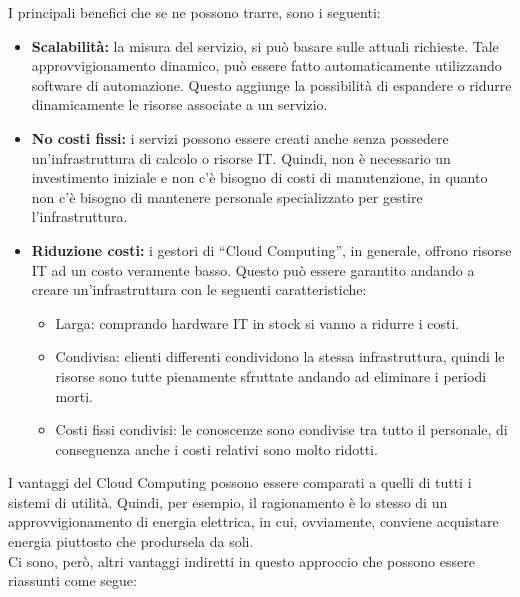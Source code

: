 \documentclass{article}
\begin{document}
I principali benefici che se ne possono trarre, sono i seguenti:
\begin{itemize}
    \item \textbf{Scalabilità:} la misura del servizio, si può basare sulle attuali richieste. Tale approvvigionamento dinamico, può essere fatto automaticamente utilizzando software di automazione. Questo aggiunge la possibilità di espandere o ridurre dinamicamente le risorse associate a un servizio.
    \item \textbf{No costi fissi:} i servizi possono essere creati anche senza possedere un’infrastruttura di calcolo o risorse IT. Quindi, non è necessario un investimento iniziale e non c’è bisogno di costi di manutenzione, in quanto non c’è bisogno di mantenere personale specializzato per gestire l’infrastruttura.
    \item \textbf{Riduzione costi:} i gestori di “Cloud Computing”, in generale, offrono risorse IT ad un costo veramente basso. Questo può essere garantito andando a creare un’infrastruttura con le seguenti caratteristiche:
    \begin{itemize}
        \item Larga: comprando hardware IT in stock si vanno a ridurre i costi.
        \item Condivisa: clienti differenti condividono la stessa infrastruttura, quindi le risorse sono tutte pienamente sfruttate andando ad eliminare i periodi morti.
        \item Costi fissi condivisi: le conoscenze sono condivise tra tutto il personale, di conseguenza anche i costi relativi sono molto ridotti.
    \end{itemize}
\end{itemize}
I vantaggi del Cloud Computing possono essere comparati a quelli di tutti i sistemi di utilità. Quindi, per esempio, il ragionamento è lo stesso di un approvvigionamento di energia elettrica, in cui, ovviamente, conviene acquistare energia piuttosto che prodursela da soli.\\ 
Ci sono, però, altri vantaggi indiretti in questo approccio che possono essere riassunti come segue:
\end{document}
